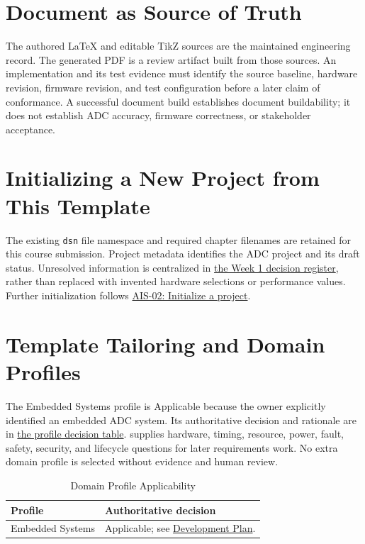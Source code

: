 \section{Document as Source of Truth}
The authored LaTeX and editable TikZ sources are the maintained engineering
record. The generated PDF is a review artifact built from those sources.
An implementation and its test evidence must identify the source baseline,
hardware revision, firmware revision, and test configuration before a later
claim of conformance. A successful document build establishes document
buildability; it does not establish ADC accuracy, firmware correctness, or
stakeholder acceptance.

\section{Initializing a New Project from This Template}
\label{Section:InitializeNewProject}
The existing \texttt{dsn} file namespace and required chapter filenames are
retained for this course submission. Project metadata identifies the ADC
project and its draft status. Unresolved information is centralized in
\hyperref[Table:WeekOneTBDs]{the Week 1 decision register}, rather than replaced
with invented hardware selections or performance values.
Further initialization follows
\hyperref[Skill:AIS-02]{AIS-02: Initialize a project}.

\section{Template Tailoring and Domain Profiles}
\label{Section:DomainProfiles}
The Embedded Systems profile is Applicable because the owner explicitly
identified an embedded ADC system. Its authoritative decision and rationale
are in \hyperref[Table:ProjectDomainProfiles]{the profile decision table}.
 supplies hardware, timing, resource,
power, fault, safety, security, and lifecycle questions for later requirements
work. No extra domain profile is selected without evidence and human review.

\begin{table}[htbp]
\centering
\caption{Domain Profile Applicability}
\label{Table:DomainProfileApplicability}
\begin{tabular}{p{3.5cm}p{8cm}}
\toprule
Profile & Authoritative decision\\
\midrule
Embedded Systems & Applicable; see
\hyperref[Table:ProjectDomainProfiles]{Development Plan}.\\
\bottomrule
\end{tabular}
\end{table}

